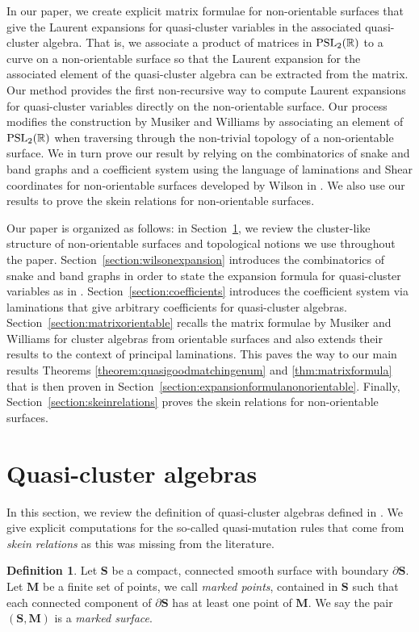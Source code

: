\documentclass[10pt,a4paper]{amsart}
\numberwithin{equation}{section}
\theoremstyle{definition}
\newtheorem{Definition}[Theorem]{Definition}
\newcommand{\SM}{(\mathbf{S}, \mathbf{M})}
\begin{document}
In our paper, we create explicit matrix formulae for non-orientable surfaces that give the Laurent expansions for quasi-cluster variables in the associated quasi-cluster algebra. That is, we associate a product of matrices in ${\rm PSL}_2(\mathbb{R})$ to a curve on a non-orientable surface so that the Laurent expansion for the associated element of the quasi-cluster algebra can be extracted from the matrix. Our method provides the first non-recursive way to compute Laurent expansions for quasi-cluster variables directly on the non-orientable surface. Our process modifies the construction by Musiker and Williams \cite{MW13} by associating an element of ${\rm PSL}_2(\mathbb{R})$ when traversing through the non-trivial topology of a non-orientable surface. We in turn prove our result by relying on the combinatorics of snake and band graphs and a coefficient system using the language of laminations and Shear coordinates for non-orientable surfaces developed by Wilson in \cite{Wil19}. We also use our results to prove the skein relations for non-orientable surfaces.

Our paper is organized as follows: in Section~\ref{section:quasiclusteralgebras}, we review the cluster-like structure of non-orientable surfaces and topological notions we use throughout the paper. Section~\ref{section:wilsonexpansion} introduces the combinatorics of snake and band graphs in order to state the expansion formula for quasi-cluster variables as in \cite{Wil19}. Section~\ref{section:coefficients} introduces the coefficient system via laminations that give arbitrary coefficients for quasi-cluster algebras. Section~\ref{section:matrixorientable} recalls the matrix formulae by Musiker and Williams for cluster algebras from orientable surfaces and also extends their results to the context of principal laminations. This paves the way to our main results Theorems \ref{theorem:quasigoodmatchingenum} and \ref{thm:matrixformula} that is then proven in Section~\ref{section:expansionformulanonorientable}. Finally, Section~\ref{section:skeinrelations} proves the skein relations for non-orientable surfaces.

\section{Quasi-cluster algebras}\label{section:quasiclusteralgebras}
In this section, we review the definition of quasi-cluster algebras defined in \cite{DP15}. We give explicit computations for the so-called quasi-mutation rules that come from \textit{skein relations} as this was missing from the literature.
\begin{Definition} \label{definition::markedsurface}
Let $\mathbf{S}$ be a compact, connected smooth surface with boundary $\partial \mathbf{S}$. Let $\mathbf{M}$ be a finite set of points, we call \textit{marked points}, contained in $\mathbf{S}$ such that each connected component of $\partial \mathbf{S}$ has at least one point of $\mathbf{M}$. We say the pair $\SM$ is a \textit{marked surface}.
\end{Definition}
\end{document}
